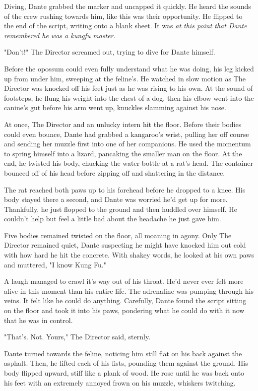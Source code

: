 Diving, Dante grabbed the marker and uncapped it quickly. He heard the sounds of the crew rushing towards him, like this was their opportunity. He flipped to the end of the script, writing onto a blank sheet. It was \emph{at this point that Dante remembered he was a kungfu master.}

"Don't!" The Director screamed out, trying to dive for Dante himself.

Before the opossum could even fully understand what he was doing, his leg kicked up from under him, sweeping at the feline's. He watched in slow motion as The Director was knocked off his feet just as he was rising to his own. At the sound of footsteps, he flung his weight into the chest of a dog, then his elbow went into the canine's gut before his arm went up, knuckles slamming against his nose.

At once, The Director and an unlucky intern hit the floor. Before their bodies could even bounce, Dante had grabbed a kangaroo's wrist, pulling her off course and sending her muzzle first into one of her companions. He used the momentum to spring himself into a lizard, pancaking the smaller man on the floor. At the end, he twisted his body, chucking the water bottle at a rat's head. The container bounced off of his head before zipping off and shattering in the distance.

The rat reached both paws up to his forehead before he dropped to a knee. His body stayed there a second, and Dante was worried he'd get up for more. Thankfully, he just flopped to the ground and then huddled over himself. He couldn't help but feel a little bad about the headache he just gave him.

Five bodies remained twisted on the floor, all moaning in agony. Only The Director remained quiet, Dante suspecting he might have knocked him out cold with how hard he hit the concrete. With shakey words, he looked at his own paws and muttered, "I know Kung Fu."

A laugh managed to crawl it's way out of his throat. He'd never ever felt more alive in this moment than his entire life. The adrenaline was pumping through his veins. It felt like he could do anything. Carefully, Dante found the script sitting on the floor and took it into his paws, pondering what he could do with it now that he was in control.

"That's. Not. Yours," The Director said, sternly.

Dante turned towards the feline, noticing him still flat on his back against the asphalt. Then, he lifted each of his fists, pounding them against the ground. His body flipped upward, stiff like a plank of wood. He rose until he was back onto his feet with an extremely annoyed frown on his muzzle, whiskers twitching.

